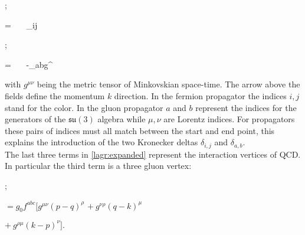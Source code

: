 \begin{minipage}{0.4\textwidth}
\begin{center}
    ;     
\end{center}
\end{minipage}
\begin{minipage}{0.58\textwidth}
        \beq \nonumber = ~~~\delta_{ij} ~~~~~~~~~~~~~~~~~~~~~~~~~~~~~\eeq
\end{minipage} 

\begin{minipage}{0.4\textwidth}
\begin{center}
    ; 
\end{center} 
\end{minipage}
\begin{minipage}{0.58\textwidth}
        \beq \nonumber = ~~~-\delta_{ab}g^{\mu\nu} ~~~~~~~~~~~~~~~~~~~~~~~~~~~~\eeq
\end{minipage}

with $g^{\mu\nu}$ being the metric tensor of Minkovskian space-time. The arrow above the fields define the momentum $k$ direction. In the fermion propagator the indices $i,j$ stand for the color. In the gluon propagator $a$ and $b$ represent the indices for the generators of the $\mathfrak{su}(3)$ algebra while $\mu,\nu$ are Lorentz indices. For propagators these pairs of indices must all match between the start and end point, this explains the introduction of the two Kronecker deltas $\delta_{i,j}$ and $\delta_{a,b}$.\\
The last three terms in \cref{lagr:expanded} represent the interaction vertices of QCD. In particular the third term is a three gluon vertex:
\begin{center}
\begin{minipage}{0.4\textwidth}
    \hspace{2cm};
\end{minipage}
\begin{minipage}{0.58\textwidth}
    \hspace{1cm} $ = g_0 f^{abc}[g^{\mu\nu}(p-q)^\rho $ \newline
    \vspace{-0.15cm}
    \hspace{2.0cm} $+~g^{\nu\rho}(q-k)^\mu $ \newline
    
    \vspace{-0.2cm}
    \hspace{2.1cm} $+~g^{\rho\mu}(k-p)^\nu ] .$
\end{minipage}
\end{center}

